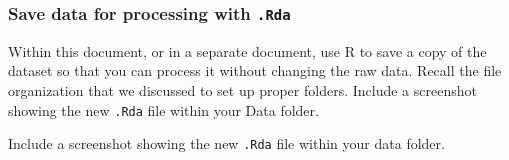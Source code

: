 \documentclass[
  letterpaper,
  DIV=11,
  numbers=noendperiod]{scrartcl}
\begin{document}
\subsubsection{\texorpdfstring{Save data for processing with
\texttt{.Rda}}{Save data for processing with .Rda}}\label{save-data-for-processing-with-.rda}

Within this document, or in a separate document, use R to save a copy of
the dataset so that you can process it without changing the raw data.
Recall the file organization that we discussed to set up proper folders.
Include a screenshot showing the new \texttt{.Rda} file within your Data
folder.

\begin{tcolorbox}[enhanced jigsaw, arc=.35mm, bottomrule=.15mm, bottomtitle=1mm, breakable, colback=white, colbacktitle=quarto-callout-important-color!10!white, colframe=quarto-callout-important-color-frame, coltitle=black, left=2mm, leftrule=.75mm, opacityback=0, opacitybacktitle=0.6, rightrule=.15mm, title=\textcolor{quarto-callout-important-color}{\faExclamation}\hspace{0.5em}{Task}, titlerule=0mm, toprule=.15mm, toptitle=1mm]

Include a screenshot showing the new \texttt{.Rda} file within your data
folder.

\end{tcolorbox}
\end{document}
